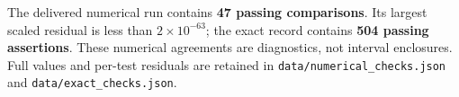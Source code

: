 \noindent The delivered numerical run contains \textbf{47 passing comparisons}. Its largest scaled residual is less than $2\times10^{-63}$; the exact record contains \textbf{504 passing assertions}. These numerical agreements are diagnostics, not interval enclosures. Full values and per-test residuals are retained in \texttt{data/numerical\_checks.json} and \texttt{data/exact\_checks.json}.
